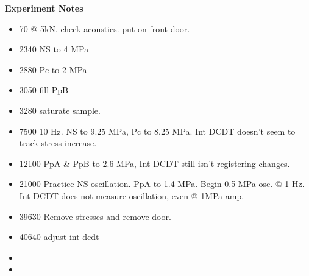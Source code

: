 \documentclass[letterpaper, 10pt]{article}
\begin{document}
\newpage 
 \textbf{Experiment Notes}
 \medskip
 {\small \begin{itemize}[label=\#]
 \setlength\itemsep{0.25em}
 	 \item 70 @ 5kN. check acoustics. put on front door.
 	 \item 2340 NS to 4 MPa 
 	 \item 2880 Pc to 2 MPa
 	 \item 3050 fill PpB
 	 \item 3280 saturate sample.
 	 \item 7500 10 Hz. NS to 9.25 MPa, Pc to 8.25 MPa. Int DCDT doesn't seem to track stress increase.
 	 \item 12100 PpA \& PpB to 2.6 MPa, Int DCDT still isn't registering changes. 
 	 \item 21000 Practice NS oscillation. PpA to 1.4 MPa. Begin 0.5 MPa osc. @ 1 Hz. Int DCDT does not measure oscillation, even @ 1MPa amp.
 	 \item 39630 Remove stresses and remove door. 
 	 \item 40640 adjust int dcdt
 	 \item 
 	 \item 
 \end{itemize}} 

 
\end{document}
